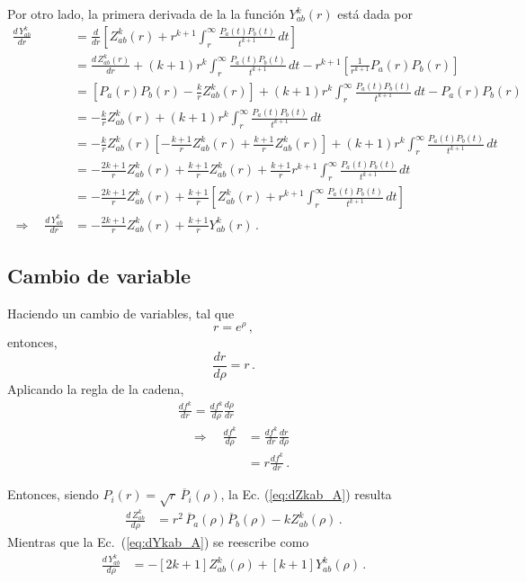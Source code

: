 \documentclass[11pt]{article}
\begin{document}
Por otro lado, la primera derivada de la la función $Y_{ab}^k(r)$ está dada por
\begin{align}
 \frac{d\,Y_{ab}^k }{dr}
 &= \frac{d}{dr} \left[ Z_{ab}^k(r) 
 + r^{k+1} \int_r^{\infty} \frac{P_a(t)P_b(t)}{t^{k+1}}\,dt \right] \\
 &= \frac{d\, Z_{ab}^k(r)}{dr} + (k+1) r^k \int_r^{\infty} \frac{P_a(t)P_b(t)}{t^{k+1}}\,dt 
 - r^{k+1}\left[ \frac{1}{r^{k+1}} P_a(r)P_b(r) \right] \\
 &= \left[ P_a(r)P_b(r) - \frac{k}{r} Z_{ab}^k(r) \right]
 + (k+1) r^k \int_r^{\infty} \frac{P_a(t)P_b(t)}{t^{k+1}}\,dt - P_a(r)P_b(r) \\
 &= -\frac{k}{r} Z_{ab}^k(r) 
 + (k+1) r^k \int_r^{\infty} \frac{P_a(t)P_b(t)}{t^{k+1}}\,dt \\
 &= -\frac{k}{r} Z_{ab}^k(r)  \left[ - \frac{k+1}{r} Z_{ab}^k(r) + \frac{k+1}{r} Z_{ab}^k(r) \right]
 + (k+1) r^k \int_r^{\infty} \frac{P_a(t)P_b(t)}{t^{k+1}}\,dt  \\
 &= -\frac{2k+1}{r} Z_{ab}^k(r) + \frac{k+1}{r} Z_{ab}^k(r)
 + \frac{k+1}{r} r^{k+1} \int_r^{\infty} \frac{P_a(t)P_b(t)}{t^{k+1}}\,dt \\
 &= -\frac{2k+1}{r} Z_{ab}^k(r) + \frac{k+1}{r} \left[ Z_{ab}^k(r)
 + r^{k+1} \int_r^{\infty} \frac{P_a(t)P_b(t)}{t^{k+1}}\,dt \right] \\
 \Rightarrow\quad\frac{d\,Y_{ab}^k }{dr}&= -\frac{2k+1}{r} Z_{ab}^k(r) + \frac{k+1}{r} Y_{ab}^k(r)\,.
 \label{eq:dYkab_A}
\end{align}

\subsection{Cambio de variable}
Haciendo un cambio de variables, tal que
\begin{equation}
r=e^{\rho}\,,
\label{eq:r-rho}
\end{equation}
entonces,
\begin{equation}
 \frac{dr}{d\rho}=r\,.
\end{equation}
Aplicando la regla de la cadena,  
\begin{align}
 \frac{df^k}{dr}=\frac{df^k}{d\rho}\frac{d\rho}{dr} \\
 \quad\Rightarrow\quad 
 \frac{df^k}{d\rho}&=\frac{df^k}{dr}\frac{dr}{d\rho}\\
 &=r\frac{df^k}{dr}\,.
\end{align}

Entonces, siendo $P_i(r)=\sqrt{r}\,\overline{P}_i(\rho)$, la Ec. (\ref{eq:dZkab_A}) resulta
\begin{align}
 \frac{d\,Z_{ab}^k}{d\rho}  &=  r^2\,\overline{P}_a(\rho)\overline{P}_b(\rho) - k Z_{ab}^k(\rho)\,.
 \label{eq:Zabk_B}
\end{align}
Mientras que la Ec.~(\ref{eq:dYkab_A}) se reescribe como
\begin{align}
 \frac{d\,Y_{ab}^k }{d\rho} &=  -[2k+1] Z_{ab}^k(\rho) + [k+1] Y_{ab}^k(\rho)\,.
 \label{eq:Yabk_B}
\end{align}
\end{document}
